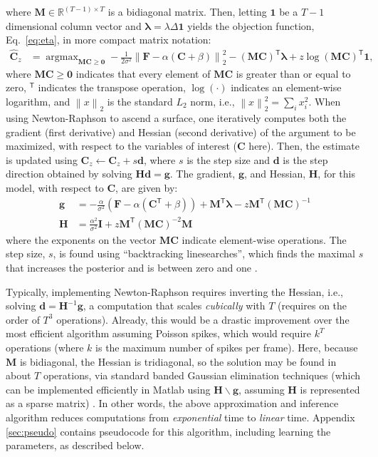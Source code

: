 \documentclass{article}
\providecommand{\ve}[1]{\boldsymbol{#1}}
\providecommand{\norm}[1]{\left \lVert#1 \right  \rVert}
\newcommand{\T}{^{\ensuremath{\mathsf{T}}}}           %
\DeclareMathOperator*{\argmax}{argmax}
\newcommand{\bd}{\ve{d}}
\newcommand{\bg}{\ve{g}}
\newcommand{\bC}{\ve{C}}
\newcommand{\bF}{\ve{F}}
\newcommand{\bH}{\ve{H}}
\newcommand{\bM}{\ve{M}}
\newcommand{\hbC}{\widehat{\ve{C}}}
\newcommand{\Del}{\Delta}
\newcommand{\sig}{\sigma}
\newcommand{\lam}{\lambda}
\newcommand{\blam}{\ve{\lambda}}
\newcommand{\zzz}{z}
\newcommand{\az}{\argmax_{\bM \bC \geq \ve{0}}}
\begin{document}
\noindent where $\ve{M} \in \mathbb{R}^{(T-1) \times T}$ is a bidiagonal matrix.  Then, letting $\ve{1}$ be a $T-1$ dimensional column vector and $\blam=\lam \Del \ve{1}$ yields the objection function, Eq.~\eqref{eq:eta}, in more compact matrix notation:
\begin{align} 
\hbC_{\zzz} 
&= \az  -\frac{1}{2 \sig^2} \norm{\bF - \alpha (\bC +\beta)}_2^2 - (\bM \bC )\T \blam  + \zzz \log(\bM \bC)\T\ve{1},  \label{eq:eta3}
\end{align}
\noindent where $\bM \bC \geq \ve{0}$ indicates that every element of $\bM \bC$ is greater than or equal to zero, $\T$ indicates the transpose operation, $\log(\cdot)$ indicates an element-wise logarithm, and $\norm{x}_2$ is the standard $L_2$ norm, i.e., $\norm{x}_2^2=\sum_i x_i^2$. When using Newton-Raphson to ascend a surface, one iteratively computes both the gradient (first derivative) and Hessian (second derivative) of the argument to be maximized, with respect to the variables of interest ($\bC$ here).  Then, the estimate is updated using $\bC_z \leftarrow \bC_z + s \bd$, where $s$ is the step size and $\bd$ is the step direction obtained by solving $\bH \bd = \bg$.  The gradient, $\bg$, and Hessian, $\bH$, for this model, with respect to $\bC$, are given by:
\begin{subequations} \label{eq:NR}
\begin{align}
\ve{g} &= -\frac{\alpha}{\sig^2}(\bF -\alpha({\bC\T} + \beta)) + \ve{M}\T\blam - \zzz \ve{M}\T (\ve{M} \bC)^{-1} \label{eq:g} \\
\ve{H} &= \frac{\alpha^2}{\sig^2} \ve{I} + \zzz \ve{M}\T (\ve{M} \bC)^{-2} \ve{M} \label{eq:H}
\end{align}
\end{subequations}
\noindent where the exponents on the vector $\bM \bC$ indicate element-wise operations. The step size, $s$, is found using ``backtracking linesearches'', which finds the maximal $s$ that increases the posterior and is between zero and one \cite{Press92}.

Typically, implementing Newton-Raphson requires inverting the Hessian, i.e.,  solving $\bd = \bH^{-1} \bg$, a computation that scales \emph{cubically} with $T$ (requires on the order of $T^3$ operations). Already, this would be a drastic improvement over the most efficient algorithm assuming Poisson spikes, which would require $k^T$ operations (where $k$ is the maximum number of spikes per frame).  Here, because $\ve{M}$ is bidiagonal, the Hessian is tridiagonal, so the solution may be found in about $T$ operations, via standard banded Gaussian elimination techniques (which can be implemented efficiently in Matlab using $\bH \backslash \bg$, assuming $\bH$ is represented as a sparse matrix) \cite{PaninskiWu09}. In other words, the above approximation and inference algorithm reduces computations from \emph{exponential} time to \emph{linear} time.  Appendix \ref{sec:pseudo} contains pseudocode for this algorithm, including learning the parameters, as described below.
\end{document}
